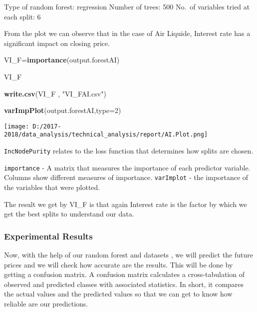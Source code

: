 \documentclass[
  11pt,
]{article}
\newenvironment{Shaded}{\begin{snugshade}}{\end{snugshade}}
\newcommand{\CommentTok}[1]{\textcolor[rgb]{0.56,0.35,0.01}{\textit{#1}}}
\newcommand{\DataTypeTok}[1]{\textcolor[rgb]{0.13,0.29,0.53}{#1}}
\newcommand{\DecValTok}[1]{\textcolor[rgb]{0.00,0.00,0.81}{#1}}
\newcommand{\KeywordTok}[1]{\textcolor[rgb]{0.13,0.29,0.53}{\textbf{#1}}}
\newcommand{\NormalTok}[1]{#1}
\newcommand{\OperatorTok}[1]{\textcolor[rgb]{0.81,0.36,0.00}{\textbf{#1}}}
\newcommand{\StringTok}[1]{\textcolor[rgb]{0.31,0.60,0.02}{#1}}
\let\origfigure\figure
\let\endorigfigure\endfigure
\renewenvironment{figure}[1][2] {
    \expandafter\origfigure\expandafter[H]
} {
    \endorigfigure
}
\begin{document}
Type of random forest: regression Number of trees: 500 No.~of variables
tried at each split: 6

From the plot we can observe that in the case of Air Liquide, Interest
rate has a significant impact on closing price.

\begin{Shaded}
\begin{Highlighting}[]
\NormalTok{VI_F=}\KeywordTok{importance}\NormalTok{(output.forestAI)}

\NormalTok{VI_F}

\KeywordTok{write.csv}\NormalTok{(VI_F , }\StringTok{"VI_FAI.csv"}\NormalTok{)}


\KeywordTok{varImpPlot}\NormalTok{(output.forestAI,}\DataTypeTok{type=}\DecValTok{2}\NormalTok{)}
\end{Highlighting}
\end{Shaded}

\begin{figure}
\centering
\texttt{[image: D:/2017-2018/data\_analysis/technical\_analysis/report/AI.Plot.png]}
\caption{Random Forest of Air Liquide}
\end{figure}

\texttt{IncNodePurity} relates to the loss function that determines how
splits are chosen.

\texttt{importance} - A matrix that measures the importance of each
predictor variable. Columns show different measures of importance.
\texttt{varImplot} - the importance of the variables that were plotted.

The result we get by VI\_F is that again Interest rate is the factor by
which we get the best splits to understand our data.

\hypertarget{experimental-results}{%
\subsubsection{Experimental Results}\label{experimental-results}}

Now, with the help of our random forest and datasets , we will predict
the future prices and we will check how accurate are the results. This
will be done by getting a confusion matrix. A confusion matrix
calculates a cross-tabulation of observed and predicted classes with
associated statistics. In short, it compares the actual values and the
predicted values so that we can get to know how reliable are our
predictions.

\begin{Shaded}
\end{Shaded}
\end{document}
